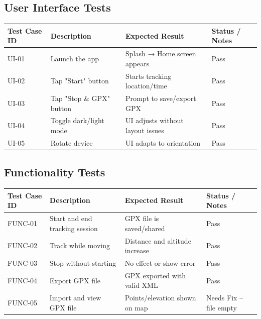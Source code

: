 \documentclass[12pt]{article}
\begin{document}
\subsection{User Interface Tests}
\begin{longtable}{|p{2.2cm}|p{5.2cm}|p{4cm}|p{2.5cm}|}
\hline
\textbf{Test Case ID} & \textbf{Description} & \textbf{Expected Result} & \textbf{Status / Notes} \\
\hline
UI-01 & Launch the app & Splash → Home screen appears & Pass \\
\hline
UI-02 & Tap "Start" button & Starts tracking location/time & Pass \\
\hline
UI-03 & Tap "Stop \& GPX" button & Prompt to save/export GPX & Pass \\
\hline
UI-04 & Toggle dark/light mode & UI adjusts without layout issues & Pass \\
\hline
UI-05 & Rotate device & UI adapts to orientation & Pass \\
\hline
\end{longtable}

\subsection{Functionality Tests}
\begin{longtable}{|p{2.2cm}|p{5.2cm}|p{4cm}|p{2.5cm}|}
\hline
\textbf{Test Case ID} & \textbf{Description} & \textbf{Expected Result} & \textbf{Status / Notes} \\
\hline
FUNC-01 & Start and end tracking session & GPX file is saved/shared & Pass \\
\hline
FUNC-02 & Track while moving & Distance and altitude increase & Pass \\
\hline
FUNC-03 & Stop without starting & No effect or show error & Pass \\
\hline
FUNC-04 & Export GPX file & GPX exported with valid XML & Pass \\
\hline
FUNC-05 & Import and view GPX file & Points/elevation shown on map & Needs Fix – file empty \\
\hline
\end{longtable}
\end{document}
